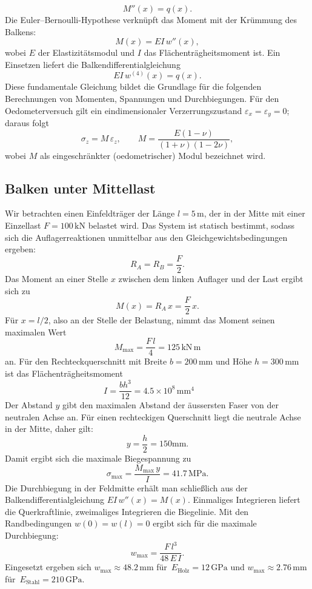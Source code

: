 \[
  M''(x) = q(x).
\]
Die Euler–Bernoulli-Hypothese verknüpft das Moment mit der 
Krümmung des Balkens:
\[
  M(x) = EI\,w''(x),
\]
wobei \(E\) der Elastizitätsmodul und \(I\) das Flächenträgheitsmoment ist. 
Ein Einsetzen liefert die Balkendifferentialgleichung
\begin{equation}
  EI\,w^{(4)}(x) = q(x).
  \label{eq:beam_dgl}
\end{equation}
Diese fundamentale Gleichung bildet die Grundlage für die folgenden 
Berechnungen von Momenten, Spannungen und Durchbiegungen.
Für den Oedometerversuch gilt ein eindimensionaler Verzerrungszustand
\(\varepsilon_x=\varepsilon_y=0\); daraus folgt
\[
  \sigma_z = M \,\varepsilon_z, \qquad
  M=\frac{E(1-\nu)}{(1+\nu)(1-2\nu)},
\]
wobei \(M\) als eingeschränkter (oedometrischer) Modul bezeichnet wird.

\subsection{Balken unter Mittellast}
Wir betrachten einen Einfeldträger der Länge \(l = 5\,\mathrm{m}\), der in der Mitte mit einer Einzellast \(F = 100\,\mathrm{kN}\) belastet wird. 
Das System ist statisch bestimmt, sodass sich die Auflagerreaktionen unmittelbar aus den Gleichgewichtsbedingungen ergeben:
\[
  R_A = R_B = \frac{F}{2}.
\]
Das Moment an einer Stelle \(x\) zwischen dem linken Auflager und der Last ergibt sich zu
\[
  M(x) = R_A \, x = \frac{F}{2}\,x.
\]
Für \(x=l/2\), also an der Stelle der Belastung, nimmt das Moment seinen 
maximalen Wert
\begin{equation}
  M_{\max} = \frac{F\,l}{4} = 125\,\mathrm{kN\,m}
  \label{eq:Mmax}
\end{equation}
an. Für den Rechteckquerschnitt mit Breite \(b=200\,\mathrm{mm}\) 
und Höhe \(h=300\,\mathrm{mm}\) ist das Flächenträgheitsmoment
\[
  I = \frac{b h^3}{12} = 4.5 \times 10^8\,\mathrm{mm^4}
  \qquad 
\]
Der Abstand \(y\) gibt den maximalen Abstand der äussersten Faser von der neutralen Achse an. 
Für einen rechteckigen Querschnitt liegt die neutrale Achse 
in der Mitte, daher gilt:
\[
  y = \frac{h}{2}= 150\mathrm{mm}.
\]
Damit ergibt sich die maximale Biegespannung zu
\begin{equation}
  \sigma_{\max} = \frac{M_{\max}\,y}{I} = 41.7\,\mathrm{MPa}.
  \label{eq:sigma_max}
\end{equation}
Die Durchbiegung in der Feldmitte erhält man schließlich aus der Balkendifferentialgleichung \(EI\,w''(x)=M(x)\). 
Einmaliges Integrieren liefert die Querkraftlinie, zweimaliges Integrieren die Biegelinie. 
Mit den Randbedingungen \(w(0)=w(l)=0\) ergibt sich für die 
maximale Durchbiegung:
\begin{equation}
  w_{\max} = \frac{F\,l^3}{48\,E\,I}.
  \label{eq:wmax}
\end{equation}
Eingesetzt ergeben sich 
\(w_{\max} \approx 48.2\,\mathrm{mm}\) für 
\(\,E_{\text{Holz}}=12\,\mathrm{GPa}\)
und
\(w_{\max} \approx 2.76\,\mathrm{mm}\) für 
\(\,E_{\text{Stahl}}=210\,\mathrm{GPa}\).
